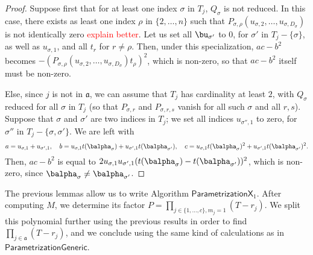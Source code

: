 \documentclass[12pt]{article}
\newcommand{\todo}[1]{\textcolor{red}{#1}}
\begin{document}
\begin{proof}
	Suppose first that for at least one index $\sigma$ in $T_j$,
	$Q_\sigma$ is not reduced. In this case, there exists as least one
	index $\rho$ in $\{2,\dots,n\}$ such that
	$P_{\sigma,\rho}(u_{\sigma,2},\dots,u_{\sigma,D_\sigma})$ is not
	identically zero \todo{explain better}. Let us set all $\bu_{\sigma'}$
	to $0$, for $\sigma'$ in $T_j-\{\sigma\}$, as well as $u_{\sigma,1}$,
	and all $t_r$ for $r\ne \rho$. Then, under this specialization,
	$ac-b^2$ becomes
	$-(P_{\sigma,\rho}(u_{\sigma,2},\dots,u_{\sigma,D_\sigma})t_\rho)^2$,
	which is non-zero, so that $ac-b^2$ itself must be non-zero.
	
	Else, since $j$ is not in $\mathfrak{a}$, we can assume that $T_j$
	has cardinality at least $2$, with $Q_\sigma$ reduced for all $\sigma$
	in $T_j$ (so that $P_{\sigma,r}$ and $P_{\sigma,r,s}$ vanish for 
	all such $\sigma$ and all $r,s$). Suppose that $\sigma$ and $\sigma'$ are two indices in
	$T_j$; we set all indices $u_{\sigma'',1}$ to zero, for $\sigma''$
	in $T_j-\{\sigma,\sigma'\}$. We are left with
	$$
	a=u_{\sigma,1}+u_{\sigma',1},\quad
	b=u_{\sigma,1}t(\balpha_{\sigma})+u_{\sigma',1}t(\balpha_{\sigma'}),\quad
	c=u_{\sigma,1}t(\balpha_{\sigma})^2+u_{\sigma',1}t(\balpha_{\sigma'})^2.
	$$
	Then, $ac-b^2$ is equal to $2u_{\sigma,1}u_{\sigma',1}(t(\balpha_{\sigma})-t(\balpha_{\sigma'}))^2$,
	which is non-zero, since $\balpha_\sigma \ne \balpha_{\sigma'}$.
\end{proof}

The previous lemmas allow us to write Algorithm
$\mathsf{ParametrizationX}_1$. After computing $M$, we determine its
factor $P=\prod_{j \in \{1,\dots,c\}, m_j=1} (T-r_j)$. We split this
polynomial further using the previous results in order to find
$\prod_{j \in \mathfrak{a}} (T-r_j)$, and we conclude using the same
kind of calculations as in $\mathsf{ParametrizationGeneric}$.
\end{document}
